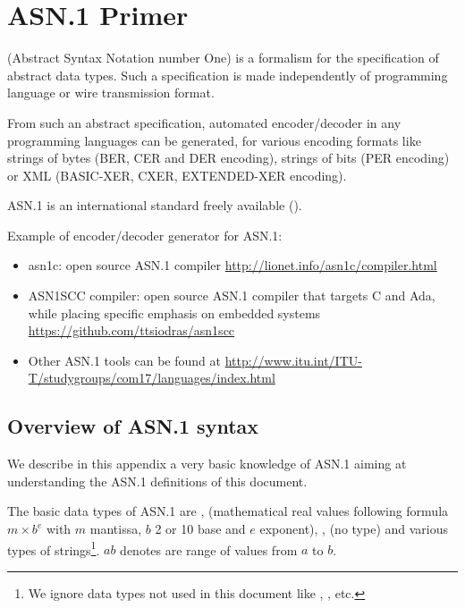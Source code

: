 \chapter{ASN.1 Primer}
\label{asn1-primer}

 (Abstract Syntax Notation number One) is a formalism
for the specification of abstract data types. Such a specification is
made independently of programming language or wire transmission
format.

From such an abstract specification, automated encoder/decoder in any
programming languages can be generated, for various encoding formats
like strings of bytes (BER, CER and DER encoding), strings of bits
(PER encoding) or XML (BASIC-XER, CXER, EXTENDED-XER encoding).

ASN.1 is an international standard freely available
(\cite{asn1-standard}).

Example of encoder/decoder generator for ASN.1:
\begin{itemize}
\item asn1c: open source ASN.1 compiler
  \url{http://lionet.info/asn1c/compiler.html}
\item ASN1SCC compiler: open source ASN.1 compiler that targets C and
  Ada, while placing specific emphasis on embedded systems
  \url{https://github.com/ttsiodras/asn1scc}
\item Other ASN.1 tools can be found at
  \url{http://www.itu.int/ITU-T/studygroups/com17/languages/index.html}
\end{itemize}

\section{Overview of ASN.1 syntax}

We describe in this appendix a very basic knowledge of ASN.1 aiming at
understanding the ASN.1 definitions of this document.

The basic data types of ASN.1 are , 
(mathematical real values following formula $m \times b^e$ with $m$
mantissa, $b$ 2 or 10 base and $e$ exponent), ,
 (no type) and various types of strings\footnote{We ignore
  data types not used in this document like ,
  , etc.}. $a$$b$ denotes are range of values
from $a$ to $b$.

